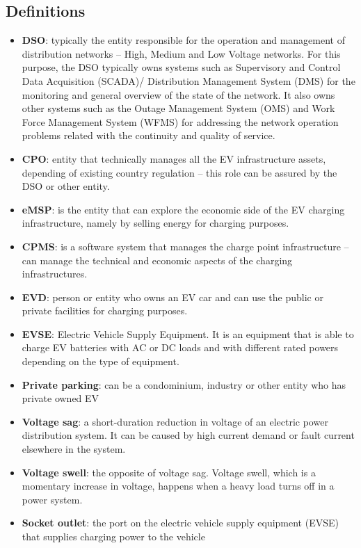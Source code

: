 \subsection{Definitions}
\begin{itemize}
    \item \textbf{DSO}: typically the entity responsible for the operation and management of distribution networks – High, Medium and Low Voltage networks. For this purpose, the DSO typically owns systems such as Supervisory and Control Data Acquisition (SCADA)/ Distribution Management System (DMS) for the monitoring and general overview of the state of the network. It also owns other systems such as the Outage Management System (OMS) and Work Force Management System (WFMS) for addressing the network operation problems related with the continuity and quality of service.
    \item \textbf{CPO}: entity that technically manages all the EV infrastructure assets, depending of existing country regulation – this role can be assured by the DSO or other entity.
    \item \textbf{eMSP}: is the entity that can explore the economic side of the EV charging infrastructure, namely by selling energy for charging purposes.
    \item \textbf{CPMS}: is a software system that manages the charge point infrastructure – can manage the technical and economic aspects of the charging infrastructures.
    \item  \textbf{EVD}: person or entity who owns an EV car and can use the public or private facilities for charging purposes.
    \item \textbf{EVSE}: Electric Vehicle Supply Equipment. It is an equipment that is able to charge EV batteries with AC or DC loads and with different rated powers depending on the type of equipment.
    \item  \textbf{Private parking}: can be a condominium, industry or other entity who has private owned EV
    \item \textbf{Voltage sag}: a short-duration reduction in voltage of an electric power distribution system. It can be caused by high current demand or fault current elsewhere in the system.
    \item \textbf{Voltage swell}: the opposite of voltage sag. Voltage swell, which is a momentary increase in voltage, happens when a heavy load turns off in a power system.
    \item \textbf{Socket outlet}: the port on the electric vehicle supply equipment (EVSE) that supplies charging power to the vehicle

\end{itemize}
